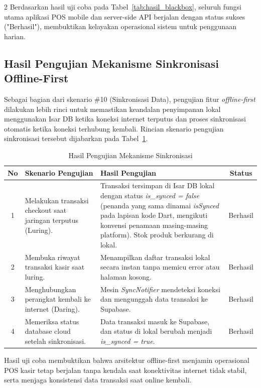 \documentclass[12pt, a4paper, onecolumn, oneside]{report}
\begin{document}
\begin{spacing}{2}
Berdasarkan hasil uji coba pada Tabel~\ref{tab:hasil_blackbox}, seluruh fungsi utama aplikasi POS mobile dan server-side API berjalan dengan status sukses ("Berhasil"), membuktikan kelayakan operasional sistem untuk penggunaan harian.

\subsection{Hasil Pengujian Mekanisme Sinkronisasi Offline-First}
Sebagai bagian dari skenario \#10 (Sinkronisasi Data), pengujian fitur \textit{offline-first} dilakukan lebih rinci untuk memastikan keandalan penyimpanan lokal menggunakan Isar DB ketika koneksi internet terputus dan proses sinkronisasi otomatis ketika koneksi terhubung kembali. Rincian skenario pengujian sinkronisasi tersebut dijabarkan pada Tabel~\ref{tab:hasil_sync}.

\begin{table}[H]
\centering
\caption{Hasil Pengujian Mekanisme Sinkronisasi}
\label{tab:hasil_sync}
\begin{tabularx}{\textwidth}{|c|X|X|c|}
\hline
\textbf{No} & \textbf{Skenario Pengujian} & \textbf{Hasil Pengujian} & \textbf{Status} \\
\hline
1 & Melakukan transaksi checkout saat jaringan terputus (Luring). & Transaksi tersimpan di Isar DB lokal dengan status \textit{is\_synced = false} (penanda yang sama dinamai \textit{isSynced} pada lapisan kode Dart, mengikuti konvensi penamaan masing-masing platform). Stok produk berkurang di lokal. & Berhasil \\
\hline
2 & Membuka riwayat transaksi kasir saat luring. & Menampilkan daftar transaksi lokal secara instan tanpa memicu error atau halaman kosong. & Berhasil \\
\hline
3 & Menghubungkan perangkat kembali ke internet (Daring). & Mesin \textit{SyncNotifier} mendeteksi koneksi dan mengunggah data transaksi ke Supabase. & Berhasil \\
\hline
4 & Memeriksa status database cloud setelah sinkronisasi. & Data transaksi masuk ke Supabase, dan status di lokal berubah menjadi \textit{is\_synced = true}. & Berhasil \\
\hline
\end{tabularx}
\end{table}

Hasil uji coba membuktikan bahwa arsitektur offline-first menjamin operasional POS kasir tetap berjalan tanpa kendala saat konektivitas internet tidak stabil, serta menjaga konsistensi data transaksi saat online kembali.


\end{spacing}
\end{document}
